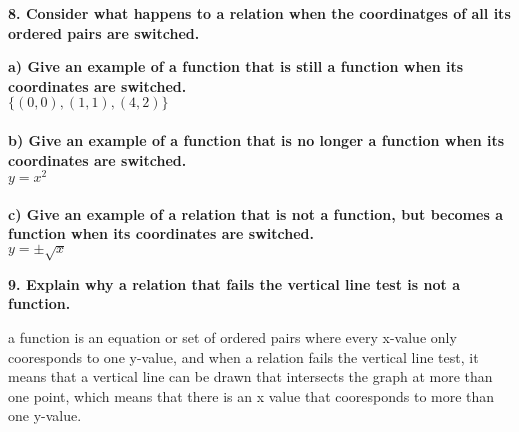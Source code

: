 \documentclass[14pt, a4paper]{extarticle}
\begin{document}
\textbf{8. Consider what happens to a relation when the coordinatges of all its ordered pairs are switched.} \\
\begin{adjustwidth}{1cm}{0pt}
    \textbf{a) Give an example of a function that is still a function when its coordinates are switched.} \\
    $\{(0,0),(1,1),(4,2)\}$ \\
    \\
    \textbf{b) Give an example of a function that is no longer a function when its coordinates are switched.} \\
    $y = x^2$ \\
    \\
    \textbf{c) Give an example of a relation that is not a function, but becomes a function when its coordinates are switched.} \\
    $y = \pm\sqrt{x}$
\end{adjustwidth}

\textbf{9. Explain why a relation that fails the vertical line test is not a function.} \\
\begin{adjustwidth}{1cm}{0pt}
    a function is an equation or set of ordered pairs where every x-value only 
    cooresponds to one y-value, and when a relation fails the vertical line test,
    it means that a vertical line can be drawn that intersects the graph at more 
    than one point, which means that there is an x value that cooresponds to more 
    than one y-value.
\end{adjustwidth}
\end{document}
